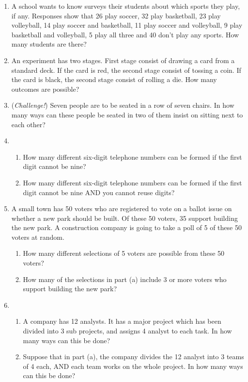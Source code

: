 \documentclass{article}
\begin{document}
\begin{enumerate}
    \item A school wants to know surveys their students about which sports they play, if any. Responses show that 26 play soccer, 32 play basketball, 23 play volleyball, 14 play soccer and basketball, 11 play soccer and volleyball, 9 play basketball and volleyball, 5 play all three and 40 don't play any sports. How many students are there?\bigskip%
    
    \item An experiment has two stages. First stage consist of drawing a card from a standard deck. If the card is red, the second stage consist of tossing a coin. If the card is black, the second stage consist of rolling a die. How many outcomes are possible?\bigskip%
    
    \item (\textit{Challenge!}) Seven people are to be seated in a row of seven chairs. In how many ways can these people be seated in two of them insist on sitting next to each other?\bigskip%
    
    \item 
    \begin{enumerate}
    	\item How many different six-digit telephone numbers can be formed if the first digit cannot be nine?%
	\item How many different six-digit telephone numbers can be formed if the first digit cannot be nine AND you cannot reuse digits?
    \end{enumerate}\bigskip
    
    \item A small town has 50 voters who are registered to vote on a ballot issue on whether a new park should be built. Of these 50 voters, 35 support building the new park. A construction company is going to take a poll of 5 of these 50 voters at random.%
    \begin{enumerate}
        \item How many different selections of 5 voters are possible from these 50 voters?
        \item How many of the selections in part (a) include 3 or more voters who support building the new park?
    \end{enumerate}\bigskip
    
    \item
    \begin{enumerate}
        \item A company has 12 analysts. It has a major project which has been divided into 3 sub projects, and assigns 4 analyst to each task. In how many ways can this be done?%
        \item Suppose that in part (a), the company divides the 12 analyst into 3 teams of 4 each, AND each team works on the whole project. In how many ways can this be done?%
    \end{enumerate}
\end{enumerate}
\end{document}

